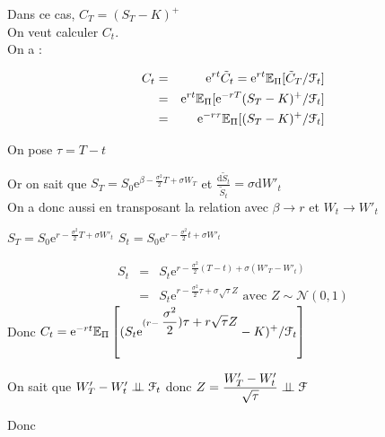 \documentclass{report}
\newcommand{\indep}{\perp \!\!\! \perp}
\begin{document}
Dans ce cas, $C_T=(S_T-K)^+$\\
On veut calculer $C_t$.\\
On a  : 
\begin{minipage}{0.65\textwidth}%
\begin{eqnarray}
C_t&=&\mbox{e}^{rt}\tilde{C}_t=\mbox{e}^{rt}\mathbb{E}_\Pi[\tilde{C}_T/\EuScript{F}_t]\nonumber\\
&=&\mbox{e}^{rt}\mathbb{E}_\Pi[\mbox{e}^{-rT}(S_T-K)^+/\EuScript{F}_t]\nonumber\\
&=&\mbox{e}^{-r\tau}\mathbb{E}_\Pi[(S_T-K)^+/\EuScript{F}_t]\nonumber
\end{eqnarray}
\end{minipage}%
\hfill
\begin{minipage}{0.35\textwidth}%
On pose $\tau = T-t$
\end{minipage}%

Or on sait que $S_T = S_0\displaystyle\mbox{e}^{\beta - \displaystyle\frac{\sigma^2}{2}T+\sigma W_T}$ et $\displaystyle\frac{\mathrm{d}\tilde{S}_t}{\tilde{S}_t}=\sigma\mathrm{d}W'_t$\\
On a donc aussi en transposant la relation avec $\beta\to r$ et $W_t\to W'_t$
\begin{multicols}{2}
$S_T = S_0\displaystyle\mbox{e}^{r - \displaystyle\frac{\sigma^2}{2}T+\sigma W'_t}$
$S_t = S_0\displaystyle\mbox{e}^{r - \displaystyle\frac{\sigma^2}{2}t+\sigma W'_t}$
\end{multicols}
\begin{eqnarray}
S_t &=& S_t\displaystyle\mbox{e}^{r - \displaystyle\frac{\sigma^2}{2}(T-t)+\sigma (W'_T-W'_t)}\nonumber\\
&=& S_t\displaystyle\mbox{e}^{r - \displaystyle\frac{\sigma^2}{2}\tau+\sigma \sqrt{\tau}Z}\mbox{ avec }Z\sim\mathcal{N}(0,1)\nonumber
\end{eqnarray}
Donc $C_t = \mbox{e}^{-rt}\mathbb{E}_\Pi\left[(\displaystyle S_t\mbox{e}^{(r-\displaystyle\frac{\sigma^2}{2})\tau+r\sqrt{\tau}Z}-K)^+/\EuScript{F}_t\right]$

On sait que $W'_T-W'_t\indep\EuScript{F}_t$ donc $Z=\displaystyle\frac{W'_T-W'_t}{\sqrt{\tau}}\indep\EuScript{F}$

Donc 
\end{document}
